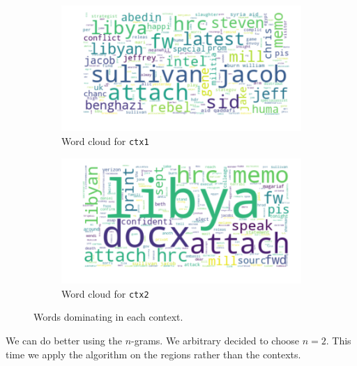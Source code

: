 \documentclass[11pt]{article}
\begin{document}
\begin{figure}[!t]
	\centering
	\begin{subfigure}[b]{0.45\linewidth}
		\centering
		\includegraphics[width=\linewidth]{images/word_cloud_ctx1.png}
		\caption[]%
		{{\small Word cloud for \texttt{ctx1}}}
		\label{fig:word_cloud_ctx1}
	\end{subfigure}
	\begin{subfigure}[b]{0.45\linewidth}
		\centering
		\includegraphics[width=\linewidth]{images/word_cloud_ctx2.png}
		\caption[]%
		{{\small Word cloud for \texttt{ctx2}}}
		\label{fig:word_cloud_ctx2}
	\end{subfigure}
	\caption{Words dominating in each context.}
	\label{fig:word_cloud}
\end{figure}

We can do better using the $n$-grams. We arbitrary decided to choose $n = 2$. This time we apply the algorithm on the regions rather than the contexts.
\end{document}
